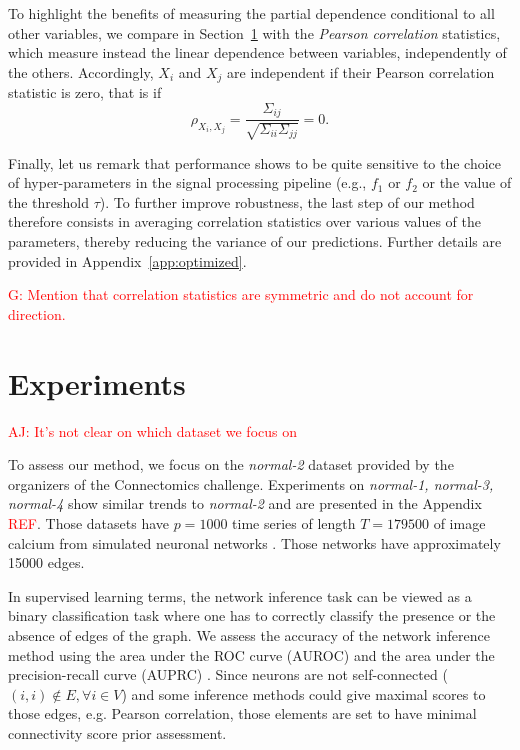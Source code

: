 \documentclass[wcp]{jmlr}
\begin{document}
To highlight the benefits of measuring the partial dependence conditional to
all other variables, we compare in Section~\ref{sec:results} with the
\textit{Pearson correlation} statistics, which measure instead the linear dependence
between variables, independently of the others. Accordingly, $X_i$ and $X_j$ are
independent if their Pearson correlation statistic is zero, that is if
\begin{equation}
\rho_{X_i,X_j} = \frac{\Sigma_{ij}}{\sqrt{\Sigma_{ii} \Sigma_{jj}}} = 0.
\end{equation}

Finally, let us remark that performance shows to be quite sensitive to the choice
of hyper-parameters in the signal processing pipeline (e.g., $f_1$ or $f_2$ or
the value of the threshold $\tau$). To further improve robustness, the last
step of our method therefore consists in averaging correlation statistics over
various values of the parameters, thereby reducing the variance of our
predictions. Further details are provided in Appendix~\ref{app:optimized}.

\textcolor{red}{G: Mention that correlation statistics are symmetric and do not account for direction.}

\section{Experiments} \label{sec:results}

\textcolor{red}{AJ: It's not clear on which dataset we focus on}

To assess our method, we focus on the \textit{normal-2} dataset
provided by the organizers of the Connectomics challenge. Experiments
on \textit{normal-1, normal-3, normal-4} show similar trends to
\textit{normal-2} and are presented in the Appendix \textcolor{red}{REF}.
Those datasets have $p=1000$ time series of length $T=179500$ of image
calcium from simulated neuronal networks \citep{stetter2012model}. Those
networks have approximately 15000 edges.

In supervised learning terms, the network inference task can be viewed as a
binary classification task where one has to correctly classify the presence
or the absence of edges of the graph. We assess the accuracy of the
network inference method using the area under the ROC curve (AUROC)
and the area under the precision-recall curve (AUPRC)
\citep{schrynemackers2013protocols}. Since neurons are not self-connected
($(i, i) \not \in E, \forall i \in V$) and some inference methods could
give maximal scores to those edges, e.g. Pearson
correlation, those elements are set to have minimal connectivity score prior
assessment.
\end{document}
